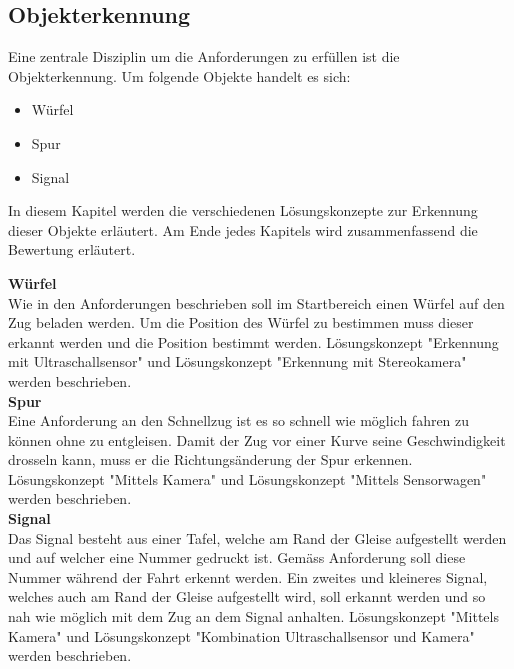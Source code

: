 \documentclass[../../../main.tex]{subfiles}
\begin{document}
    \subsection{Objekterkennung}
    Eine zentrale Disziplin um die Anforderungen zu erfüllen ist die Objekterkennung. Um folgende Objekte handelt es sich:

    \begin{itemize}
        \item Würfel
        \item Spur
        \item Signal
    \end{itemize}
    \vspace{0.5cm}

    In diesem Kapitel werden die verschiedenen Lösungskonzepte zur Erkennung dieser Objekte erläutert. Am Ende jedes Kapitels wird zusammenfassend die Bewertung erläutert.

    \textbf{Würfel}\\
    Wie in den Anforderungen beschrieben soll im Startbereich einen Würfel auf den Zug beladen werden. Um die Position des Würfel zu bestimmen muss dieser erkannt werden
    und die Position bestimmt werden. Lösungskonzept "Erkennung mit Ultraschallsensor" und Lösungskonzept "Erkennung mit Stereokamera" werden beschrieben.\\

    \textbf{Spur}\\
    Eine Anforderung an den Schnellzug ist es so schnell wie möglich fahren zu können ohne zu entgleisen. Damit der Zug vor einer Kurve seine Geschwindigkeit
    drosseln kann, muss er die Richtungsänderung der Spur erkennen. Lösungskonzept "Mittels Kamera" und Lösungskonzept "Mittels Sensorwagen" werden beschrieben.\\

    \textbf{Signal}\\
    Das Signal besteht aus einer Tafel, welche am Rand der Gleise aufgestellt werden und auf welcher eine Nummer gedruckt ist. Gemäss Anforderung soll diese Nummer
    während der Fahrt erkennt werden. Ein zweites und kleineres Signal, welches auch am Rand der Gleise aufgestellt wird, soll erkannt werden und so nah wie möglich 
    mit dem Zug an dem Signal anhalten. Lösungskonzept "Mittels Kamera" und Lösungskonzept "Kombination Ultraschallsensor und Kamera" werden beschrieben.
\end{document}
